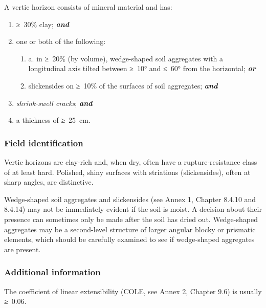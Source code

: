 \documentclass[
  letterpaper,
  DIV=11,
  numbers=noendperiod]{scrreprt}
\providecommand{\tightlist}{%
  \setlength{\itemsep}{0pt}\setlength{\parskip}{0pt}}\usepackage{longtable,booktabs,array}
\begin{document}
A vertic horizon consists of mineral material and has:

\begin{enumerate}
\def\labelenumi{\arabic{enumi}.}
\item
  ≥~30\% clay; \textbf{\emph{and}}
\item
  one or both of the following:

  \begin{enumerate}
  \def\labelenumii{\alph{enumii}.}
  \tightlist
  \item
    a. in ≥~20\% (by volume), wedge-shaped soil aggregates with a
    longitudinal axis tilted between ≥~10° and ≤~60° from the
    horizontal; \textbf{\emph{or}}
  \item
    slickensides on ≥~10\% of the surfaces of soil aggregates;
    \textbf{\emph{and}}
  \end{enumerate}
\item
  \emph{shrink-swell cracks}; \textbf{\emph{and}}
\item
  a thickness of ≥~25~cm.
\end{enumerate}

\hypertarget{field-identification-31}{%
\subsubsection{Field identification}\label{field-identification-31}}

Vertic horizons are clay-rich and, when dry, often have a
rupture-resistance class of at least hard. Polished, shiny surfaces with
striations (slickensides), often at sharp angles, are distinctive.

Wedge-shaped soil aggregates and slickensides (see Annex 1, Chapter
8.4.10 and 8.4.14) may not be immediately evident if the soil is moist.
A decision about their presence can sometimes only be made after the
soil has dried out. Wedge-shaped aggregates may be a second-level
structure of larger angular blocky or prismatic elements, which should
be carefully examined to see if wedge-shaped aggregates are present.

\hypertarget{additional-information-21}{%
\subsubsection{Additional information}\label{additional-information-21}}

The coefficient of linear extensibility (COLE, see Annex 2, Chapter 9.6)
is usually ≥~0.06.
\end{document}
